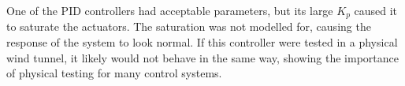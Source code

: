 \documentclass[12pt]{article}
\begin{document}
One of the PID controllers had acceptable parameters, but its large $K_p$ caused it to saturate the actuators. The saturation was not modelled for, causing the response of the system to look normal. If this controller were tested in a physical wind tunnel, it likely would not behave in the same way, showing the importance of physical testing for many control systems.
\end{document}
